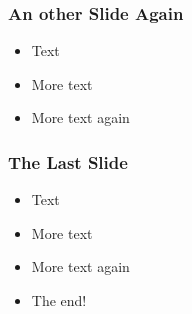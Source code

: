 \documentclass[handout,xcolor=pdftex,dvipsnames,table]{beamer}
\begin{document}
\begin{frame} 
\frametitle{An other Slide Again}
\begin{itemize}[<+->]
 \item Text
 \item More text
 \item More text again
\end{itemize}
\end{frame}

\begin{frame} 
\frametitle{The Last Slide}
\begin{itemize}[<+->]
 \item Text
 \item More text
 \item More text again
 \item The end!
\end{itemize}
\end{frame}
\end{document}
